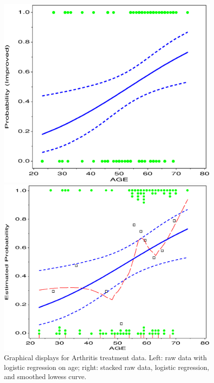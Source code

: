 \begin{figure}[htb]
 \begin{minipage}[c]{.49\linewidth}
  \includegraphics[width=1\linewidth,clip]{ch1/fig/logist1c0}
 \end{minipage}%
 \hfill
 \begin{minipage}[c]{.49\linewidth}
  \includegraphics[width=1\linewidth,clip]{ch6/fig/logoddt2}
 \end{minipage}
 \caption[Graphical displays for Arthritis treatment data]{Graphical displays for Arthritis treatment data. Left: raw data
 with logistic regression on age; right: stacked raw data, logistic regression, and smoothed lowess curve.}\label{fig:logist1c0}
\end{figure}


